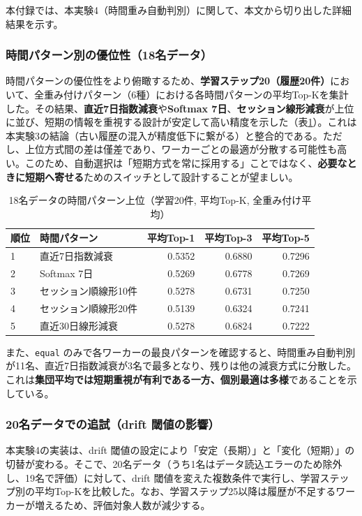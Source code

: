 本付録では、本実験4（時間重み自動判別）に関して、本文から切り出した詳細結果を示す。

\subsubsection*{時間パターン別の優位性（18名データ）}
時間パターンの優位性をより俯瞰するため、\textbf{学習ステップ20（履歴20件）}において、全重み付けパターン（6種）における各時間パターンの平均Top-Kを集計した。その結果、\textbf{直近7日指数減衰}や\textbf{Softmax 7日}、\textbf{セッション線形減衰}が上位に並び、短期の情報を重視する設計が安定して高い精度を示した（表\ref{tab:time-pattern-ranking-20}）。これは本実験3の結論（古い履歴の混入が精度低下に繋がる）と整合的である。ただし、上位方式間の差は僅差であり、ワーカーごとの最適が分散する可能性も高い。このため、自動選択は「短期方式を常に採用する」ことではなく、\textbf{必要なときに短期へ寄せる}ためのスイッチとして設計することが望ましい。

\begin{table}[htbp]
\centering
\caption{18名データの時間パターン上位（学習20件, 平均Top-K, 全重み付け平均）}
\label{tab:time-pattern-ranking-20}
\scriptsize
\begin{tabular}{l l r r r}
\hline
順位 & 時間パターン & 平均Top-1 & 平均Top-3 & 平均Top-5 \\
\hline
1 & 直近7日指数減衰 & 0.5352 & 0.6880 & 0.7296 \\
2 & Softmax 7日 & 0.5269 & 0.6778 & 0.7269 \\
3 & セッション順線形10件 & 0.5278 & 0.6731 & 0.7250 \\
4 & セッション順線形20件 & 0.5139 & 0.6324 & 0.7241 \\
5 & 直近30日線形減衰 & 0.5278 & 0.6824 & 0.7222 \\
\hline
\end{tabular}
\end{table}

また、\texttt{equal} のみで各ワーカーの最良パターンを確認すると、時間重み自動判別が11名、直近7日指数減衰が3名で最多となり、残りは他の減衰方式に分散した。これは\textbf{集団平均では短期重視が有利である一方、個別最適は多様}であることを示している。

\subsubsection*{20名データでの追試（drift 閾値の影響）}
本実験4の実装は、drift 閾値の設定により「安定（長期）」と「変化（短期）」の切替が変わる。そこで、20名データ（うち1名はデータ読込エラーのため除外し、19名で評価）に対して、drift 閾値を変えた複数条件で実行し、学習ステップ別の平均Top-Kを比較した。なお、学習ステップ25以降は履歴が不足するワーカーが増えるため、評価対象人数が減少する。

